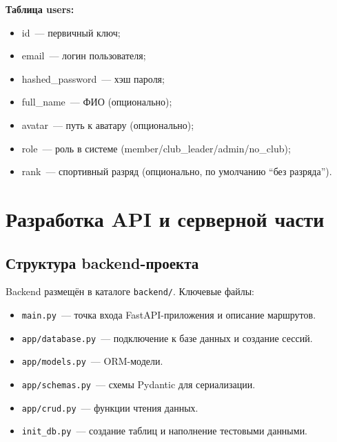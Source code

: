 \documentclass[utf8, russian]{eskdtext}
\let\stdsection\section
\renewcommand \section{\newpage\stdsection}
\begin{document}
\textbf{Таблица users:}
\begin{itemize}
  \item id~--- первичный ключ;
  \item email~--- логин пользователя;
  \item hashed\_password~--- хэш пароля;
  \item full\_name~--- ФИО (опционально);
  \item avatar~--- путь к аватару (опционально);
  \item role~--- роль в системе (member/club\_leader/admin/no\_club);
  \item rank~--- спортивный разряд (опционально, по умолчанию \textquotedblleft без разряда\textquotedblright).
\end{itemize}

\section{Разработка API и серверной части}
\subsection{Структура backend-проекта}
Backend размещён в каталоге \texttt{backend/}. Ключевые файлы:
\begin{itemize}
  \item \texttt{main.py}~--- точка входа FastAPI-приложения и описание маршрутов.
  \item \texttt{app/database.py}~--- подключение к базе данных и создание сессий.
  \item \texttt{app/models.py}~--- ORM-модели.
  \item \texttt{app/schemas.py}~--- схемы Pydantic для сериализации.
  \item \texttt{app/crud.py}~--- функции чтения данных.
  \item \texttt{init\_db.py}~--- создание таблиц и наполнение тестовыми данными.
\end{itemize}
\end{document}
